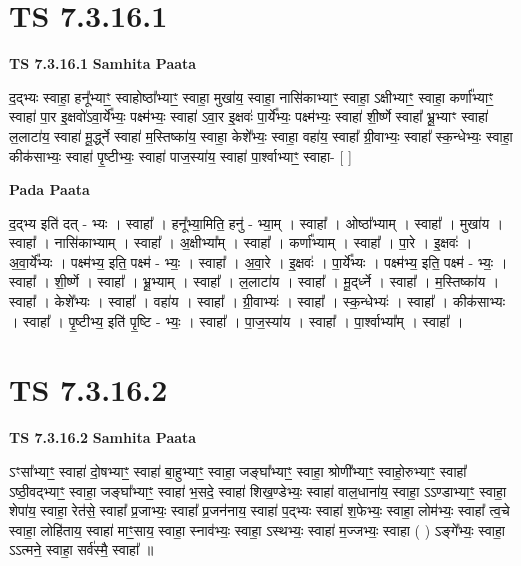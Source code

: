 \documentclass[17pt]{extarticle}
\begin{document}

\section{ TS 7.3.16.1 }

\textbf{TS 7.3.16.1 } \newline
\textbf{Samhita Paata} \newline

द॒द्भ्यः स्वाहा॒ हनू᳚भ्याꣳ॒॒ स्वाहोष्ठा᳚भ्याꣳ॒॒ स्वाहा॒ मुखा॑य॒ स्वाहा॒ नासि॑काभ्याꣳ॒॒ स्वाहा॒ ऽक्षीभ्याꣳ॒॒ स्वाहा॒ कर्णा᳚भ्याꣳ॒॒ स्वाहा॑ पा॒र इ॒क्षवो॑ऽवा॒र्ये᳚भ्यः॒ पक्ष्म॑भ्यः॒ स्वाहा॑ ऽवा॒र इ॒क्षवः॑ पा॒र्ये᳚भ्यः॒ पक्ष्म॑भ्यः॒ स्वाहा॑ शी॒र्ष्णे स्वाहा᳚ भ्रू॒भ्याꣳ स्वाहा॑ ल॒लाटा॑य॒ स्वाहा॑ मू॒र्द्ध्ने स्वाहा॑ म॒स्तिष्का॑य॒ स्वाहा॒ केशे᳚भ्यः॒ स्वाहा॒ वहा॑य॒ स्वाहा᳚ ग्री॒वाभ्यः॒ स्वाहा᳚ स्क॒न्धेभ्यः॒ स्वाहा॒ कीक॑साभ्यः॒ स्वाहा॑ पृ॒ष्टीभ्यः॒ स्वाहा॑ पाज॒स्या॑य॒ स्वाहा॑ पा॒र्श्वाभ्याꣳ॒॒ स्वाहा- [  ] \newline

\textbf{Pada Paata} \newline

द॒द्भ्य इति॑ दत् - भ्यः । स्वाहा᳚ । हनू᳚भ्या॒मिति॒ हनु॑ - भ्या॒म् । स्वाहा᳚ । ओष्ठा᳚भ्याम् । स्वाहा᳚ । मुखा॑य । स्वाहा᳚ । नासि॑काभ्याम् । स्वाहा᳚ । अ॒क्षीभ्या᳚म् । स्वाहा᳚ । कर्णा᳚भ्याम् । स्वाहा᳚ । पा॒रे । इ॒क्षवः॑ । अ॒वा॒र्ये᳚भ्यः । पक्ष्म॑भ्य॒ इति॒ पक्ष्म॑ - भ्यः॒ । स्वाहा᳚ । अ॒वा॒रे । इ॒क्षवः॑ । पा॒र्ये᳚भ्यः । पक्ष्म॑भ्य॒ इति॒ पक्ष्म॑ - भ्यः॒ । स्वाहा᳚ । शी॒र्ष्णे । स्वाहा᳚ । भ्रू॒भ्याम् । स्वाहा᳚ । ल॒लाटा॑य । स्वाहा᳚ । मू॒द्‌र्ध्ने । स्वाहा᳚ । म॒स्तिष्का॑य । स्वाहा᳚ । केशे᳚भ्यः । स्वाहा᳚ । वहा॑य । स्वाहा᳚ । ग्री॒वाभ्यः॑ । स्वाहा᳚ । स्क॒न्धेभ्यः॑ । स्वाहा᳚ । कीक॑साभ्यः । स्वाहा᳚ । पृ॒ष्टीभ्य॒ इति॑ पृ॒ष्टि - भ्यः॒ । स्वाहा᳚ । पा॒ज॒स्या॑य । स्वाहा᳚ । पा॒र्श्वाभ्या᳚म् । स्वाहा᳚ ।  \newline





\section{ TS 7.3.16.2 }

\textbf{TS 7.3.16.2 } \newline
\textbf{Samhita Paata} \newline

ऽꣳसा᳚भ्याꣳ॒॒ स्वाहा॑ दो॒षभ्याꣳ॒॒ स्वाहा॑ बा॒हुभ्याꣳ॒॒ स्वाहा॒ जङ्घा᳚भ्याꣳ॒॒ स्वाहा॒ श्रोणी᳚भ्याꣳ॒॒ स्वाहो॒रुभ्याꣳ॒॒ स्वाहा᳚ ऽष्ठी॒वद्भ्याꣳ॒॒ स्वाहा॒ जङ्घा᳚भ्याꣳ॒॒ स्वाहा॑ भ॒सदे॒ स्वाहा॑ शिख॒ण्डेभ्यः॒ स्वाहा॑ वाल॒धाना॑य॒ स्वाहा॒ ऽऽण्डाभ्याꣳ॒॒ स्वाहा॒ शेपा॑य॒ स्वाहा॒ रेत॑से॒ स्वाहा᳚ प्र॒जाभ्यः॒ स्वाहा᳚ प्र॒जन॑नाय॒ स्वाहा॑ प॒द्भ्यः स्वाहा॑ श॒फेभ्यः॒ स्वाहा॒ लोम॑भ्यः॒ स्वाहा᳚ त्व॒चे स्वाहा॒ लोहि॑ताय॒ स्वाहा॑ माꣳ॒॒साय॒ स्वाहा॒ स्नाव॑भ्यः॒ स्वाहा॒ ऽस्थभ्यः॒ स्वाहा॑ म॒ज्जभ्यः॒ स्वाहा ( ) ऽङ्गे᳚भ्यः॒ स्वाहा॒ ऽऽत्मने॒ स्वाहा॒ सर्व॑स्मै॒ स्वाहा᳚ ॥ \newline
\end{document}
